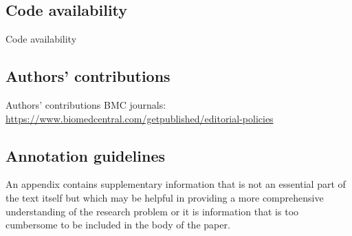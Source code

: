 \documentclass[sn-mathphys,Numbered]{sn-jnl}%
\theoremstyle{thmstyleone}%
\theoremstyle{thmstyletwo}%
\theoremstyle{thmstylethree}%
\begin{document}
\subsection*{Code availability}
%
Code availability 
%
%
%
\subsection*{Authors' contributions}
%
Authors' contributions
BMC journals: \url{https://www.biomedcentral.com/getpublished/editorial-policies}
%
%
%
%
\begin{appendices}
%
%
%
\section{Annotation guidelines}\label{annot_guidelines}
%
An appendix contains supplementary information that is not an essential part of the text itself but which may be helpful in providing a more comprehensive understanding of the research problem or it is information that is too cumbersome to be included in the body of the paper.
%
%
%
\end{appendices}


\end{document}
